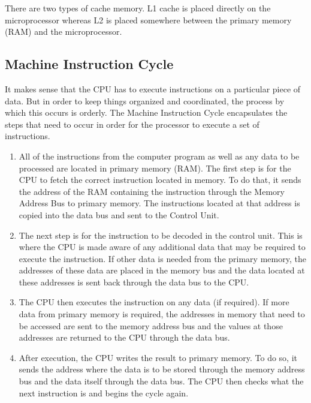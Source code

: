 There are two types of cache memory. L1 cache is placed directly on the microprocessor whereas L2 is placed somewhere between the primary memory (RAM) and the microprocessor. 

\subsection*{Machine Instruction Cycle}
It makes sense that the CPU has to execute instructions on a particular piece of data. But in order to keep things organized and coordinated, the process by which this occurs is orderly. The Machine Instruction Cycle encapsulates the steps that need to occur in order for the processor to execute a set of instructions.

\begin{enumerate}
	\item All of the instructions from the computer program as well as any data to be processed are located in primary memory (RAM). The first step is for the CPU to fetch the correct instruction located in memory. To do that, it sends the address of the RAM containing the instruction through the Memory Address Bus to primary memory. The instructions located at that address is copied into the data bus and sent to the Control Unit. 
	\item The next step is for the instruction to be decoded in the control unit. This is where the CPU is made aware of any additional data that may be required to execute the instruction. If other data is needed from the primary memory, the addresses of these data are placed in the memory bus and the data located at these addresses is sent back through the data bus to the CPU.
	\item The CPU then executes the instruction on any data (if required). If more data from primary memory is required, the addresses in memory that need to be accessed are sent to the memory address bus and the values at those addresses are returned to the CPU through the data bus.
	\item After execution, the CPU writes the result to primary memory. To do so, it sends the address where the data is to be stored through the memory address bus and the data itself through the data bus. The CPU then checks what the next instruction is and begins the cycle again.
\end{enumerate}
